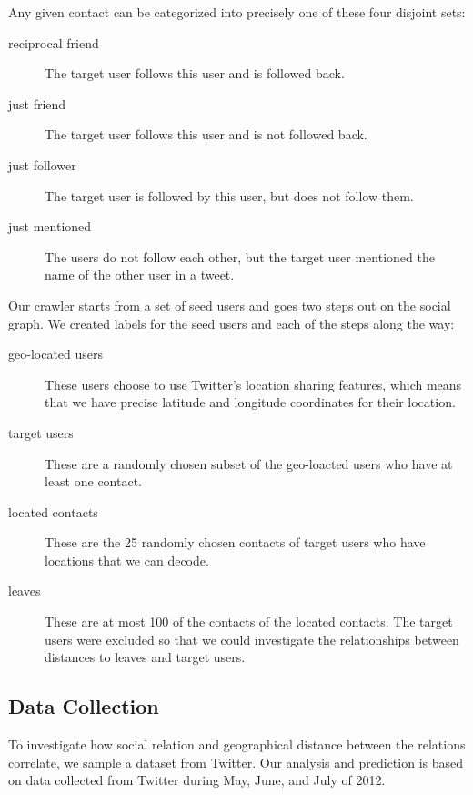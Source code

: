 Any given contact can be categorized into precisely one of these four disjoint
sets:
\begin{description}
\item[reciprocal friend] The target user follows this user and is followed
    back.
\item[just friend] The target user follows this user and is not followed
    back.
\item[just follower] The target user is followed by this user, but does
    not follow them.
\item[just mentioned] The users do not follow each other, but the target
    user mentioned the name of the other user in a tweet.
\end{description}

Our crawler starts from a set of seed users and goes two steps out on the
social graph.
%
We created labels for the seed users and each of the steps along the way:

\begin{description}
\item[geo-located users] These users choose to use Twitter's location sharing
    features, which means that we have precise latitude and longitude
    coordinates for their location.
\item[target users] These are a randomly chosen subset of the geo-loacted users
    who have at least one contact.
\item[located contacts] These are the 25 randomly chosen contacts of
    target users who have locations that we can decode.
\item[leaves] These are at most 100 of the contacts of the located contacts.
    The target users were excluded so that we could investigate the
    relationships between distances to leaves and target users.
\end{description}


\subsection{Data Collection}
To investigate how social relation and geographical distance between the
relations correlate, we sample a dataset from Twitter.
%
Our analysis and prediction is based on data collected from Twitter during
May, June, and July of 2012.

